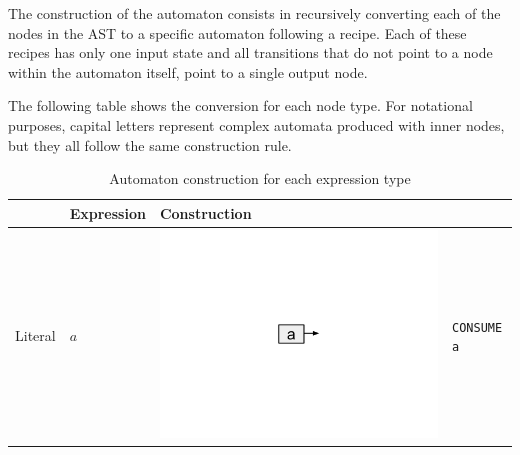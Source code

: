 \documentclass{llncs}
\begin{document}
The construction of the automaton consists in recursively converting each of the nodes in the AST to a specific automaton following a recipe. Each of these recipes has only one input state and all transitions that do not point to a node within the automaton itself, point to a single output node. 

The following table shows the conversion for each node type. For notational purposes, capital letters represent complex automata produced with inner nodes, but they all follow the same construction rule.

\begin{table}
\begin{center}
	\caption{Automaton construction for each expression type}
	\begin{tabular}{ >{\centering\arraybackslash}m{0.6in} | >{\centering\arraybackslash}m{0.7in} | >{\centering\arraybackslash}m{1.3in} | m{1.8in} }

		\hline
		{\bf Type} & {\bf Expression} & {\bf Construction} & \centering\arraybackslash{\bf Instructions} \\
		\hline
		Literal & $a$ & \includegraphics[trim=4in 4in 4in 3.8in, scale=0.20]{figures/thompson_literal.pdf} &
            \texttt{CONSUME a}
        \\


\end{tabular}
\end{center}
\end{table}
\end{document}
